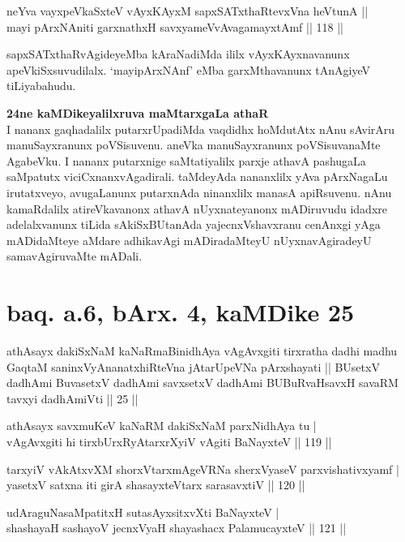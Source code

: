 \begin{shl}
neYva vayxpeVkaSxteV vAyxKAyxM sapxSATxthaRtevxVna heVtunA || \\
mayi pArxNAniti garxnathxH savxyameVvAvagamayxtAmf \hfill|| 118 || 
\end{shl}

\begin{artha}
sapxSATxthaRvAgideyeMba kAraNadiMda ililx vAyxKAyxnavanunx 
apeVkiSxsuvudilalx. `mayipArxNAnf' eMba garxMthavanunx tAnAgiyeV
tiLiyabahudu.

\textbf{24ne kaMDikeyalilxruva maMtarxgaLa athaR}\\
I nananx gaqhadalilx putarxrUpadiMda vaqdidhx hoMdutAtx nAnu sAvirAru 
manuSayxranunx poVSisuvenu. aneVka manuSayxranunx poVSisuvanaMte 
AgabeVku. I nananx putarxnige saMtatiyalilx parxje athavA pashugaLa 
saMpatutx viciCxnanxvAgadirali. taMdeyAda nananxlilx yAva pArxNagaLu 
irutatxveyo, avugaLanunx putarxnAda ninanxlilx manasA apiRsuvenu. 
nAnu kamaRdalilx atireVkavanonx athavA nUyxnateyanonx mADiruvudu 
idadxre adelalxvanunx tiLida sAkiSxBUtanAda yajecnxVshavxranu cenAnxgi 
yAga mADidaMteye aMdare adhikavAgi mADiradaMteyU nUyxnavAgiradeyU 
samavAgiruvaMte mADali.
\end{artha}

\section*{baq. a.6, bArx. 4, kaMDike 25}

\begin{shl}
athAsayx dakiSxNaM kaNaRmaBinidhAya vAgAvxgiti tirxratha dadhi madhu GaqtaM saninxVyAnanatxhiRteVna jAtarUpeVNa pArxshayati || BUsetxV dadhAmi BuvasetxV dadhAmi savxsetxV dadhAmi BUBuRvaHsavxH savaRM tavxyi dadhAmiVti || 25 ||
\end{shl}

\begin{shl}
athAsayx savxmuKeV kaNaRM dakiSxNaM parxNidhAya tu | \\
vAgAvxgiti hi tirxbUrxRyAtarxrXyiV vAgiti BaNayxteV \hfill|| 119 || 
\end{shl}

\begin{shl}
tarxyiV vAkAtxvXM shorxVtarxmAgeVRNa sherxVyaseV parxvishativxyamf | \\
yasetxV satxna iti girA shasayxteV\s tarx sarasavxtiV \hfill|| 120 || 
\end{shl}

\begin{shl}
udAraguNasaMpatitxH sutasAyxsitxvXti BaNayxteV | \\
shashayaH sashayoV jecnxVyaH shayashacx PalamucayxteV \hfill|| 121 || 
\end{shl}

